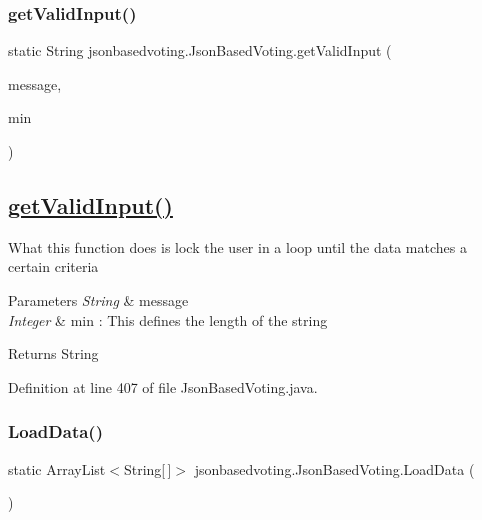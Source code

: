 \subsubsection{\texorpdfstring{getValidInput()}{getValidInput()}}
{\footnotesize\ttfamily static String jsonbasedvoting.\+Json\+Based\+Voting.\+get\+Valid\+Input (\begin{DoxyParamCaption}\item[{String}]{message,  }\item[{Integer}]{min }\end{DoxyParamCaption})\hspace{0.3cm}{\ttfamily [static]}}

\subsection*{\mbox{\hyperlink{classjsonbasedvoting_1_1_json_based_voting_ac532552d0367e4f16155ea8bec904f88}{get\+Valid\+Input()}} }

What this function does is lock the user in a loop until the data matches a certain criteria 
\begin{DoxyParams}{Parameters}
{\em String} & message \\
\hline
{\em Integer} & min \+: This defines the length of the string \\
\hline
\end{DoxyParams}
\begin{DoxyReturn}{Returns}
String 
\end{DoxyReturn}


Definition at line 407 of file Json\+Based\+Voting.\+java.

\mbox{\label{classjsonbasedvoting_1_1_json_based_voting_adbcb2c2a084932df90996c7199251579}} 
\subsubsection{\texorpdfstring{LoadData()}{LoadData()}}
{\footnotesize\ttfamily static Array\+List$<$String\mbox{[}$\,$\mbox{]}$>$ jsonbasedvoting.\+Json\+Based\+Voting.\+Load\+Data (\begin{DoxyParamCaption}{ }\end{DoxyParamCaption})\hspace{0.3cm}{\ttfamily [static]}}

